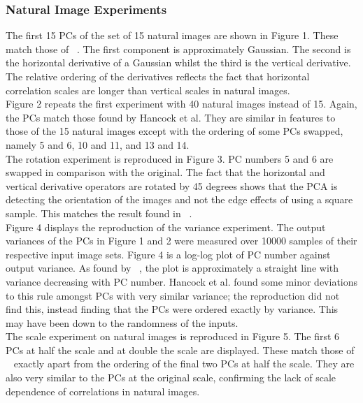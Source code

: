 \subsubsection{Natural Image Experiments}
The first 15 PCs of the set of 15 natural images are shown in Figure 1. These match those of ~\cite{Hancock}. The first component is approximately Gaussian. The second is the horizontal derivative of a Gaussian whilst the third is the vertical derivative. The relative ordering of the derivatives reflects the fact that horizontal correlation scales are longer than vertical scales in natural images.\\
Figure 2 repeats the first experiment with 40 natural images instead of 15. Again, the PCs match those found by Hancock et al. They are similar in features to those of the 15 natural images except with the ordering of some PCs swapped, namely 5 and 6, 10 and 11, and 13 and 14.\\
The rotation experiment is reproduced in Figure 3. PC numbers 5 and 6 are swapped in comparison with the original. The fact that the horizontal and vertical derivative operators are rotated by 45 degrees shows that the PCA is detecting the orientation of the images and not the edge effects of using a square sample. This matches the result found in ~\cite{Sanger}.\\
Figure 4 displays the reproduction of the variance experiment. The output variances of the PCs in Figure 1 and 2 were measured over 10000 samples of their respective input image sets. Figure 4 is a log-log plot of PC number against output variance. As found by ~\cite{Hancock}, the plot is approximately a straight line with variance decreasing with PC number. Hancock et al. found some minor deviations to this rule amongst PCs with very similar variance; the reproduction did not find this, instead finding that the PCs were ordered exactly by variance. This may have been down to the randomness of the inputs.\\
 The scale experiment on natural images is reproduced in Figure 5. The first 6 PCs at half the scale and at double the scale are displayed. These match those of ~\cite{Hancock} exactly apart from the ordering of the final two PCs at half the scale. They are also very similar to the PCs at the original scale, confirming the lack of scale dependence of correlations in natural images.\\
